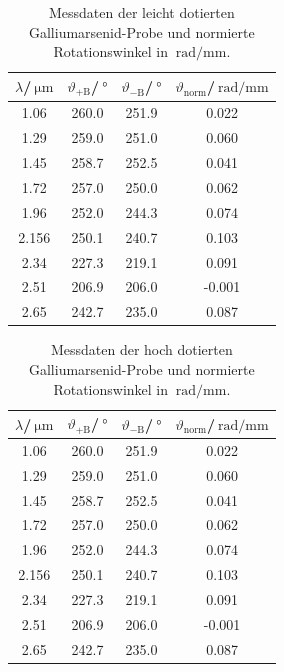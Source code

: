 \begin{table}[h!]
  \centering
  \caption{Messdaten der leicht dotierten Galliumarsenid-Probe und normierte Rotationswinkel in $\SI{}{\radian\per\milli\meter}$.}
  \label{tab:tief}
  \begin{tabular}{c | c | c | c}
    \toprule
    $\lambda$/$\SI{}{\micro\meter}$ & $\vartheta_\mathrm{+B}$/$\SI{}{\degree}$ & $\vartheta_\mathrm{-B}$/$\SI{}{\degree}$& $\vartheta_{\mathrm{norm}}$/$\SI{}{\radian\per\milli\meter}$ \\
    \midrule
    1.06 & 260.0 & 251.9 & 0.022 \\
    1.29 & 259.0 & 251.0 & 0.060 \\
    1.45 & 258.7 & 252.5 & 0.041 \\
    1.72 & 257.0 & 250.0 & 0.062 \\
    1.96 & 252.0 & 244.3 & 0.074 \\
    2.156 & 250.1 & 240.7 & 0.103 \\
    2.34 & 227.3 & 219.1 & 0.091 \\
    2.51 & 206.9 & 206.0 & -0.001 \\
    2.65 & 242.7 & 235.0 & 0.087 \\
    \bottomrule
  \end{tabular}
\end{table}

\begin{table}[h!]
  \centering
  \caption{Messdaten der hoch dotierten Galliumarsenid-Probe und normierte Rotationswinkel in $\SI{}{\radian\per\milli\meter}$.}
  \label{tab:hoch}
  \begin{tabular}{c | c | c | c}
    \toprule
    $\lambda$/$\SI{}{\micro\meter}$ & $\vartheta_\mathrm{+B}$/$\SI{}{\degree}$ & $\vartheta_\mathrm{-B}$/$\SI{}{\degree}$& $\vartheta_{\mathrm{norm}}$/$\SI{}{\radian\per\milli\meter}$ \\
    \midrule
    1.06 & 260.0 & 251.9 & 0.022 \\
    1.29 & 259.0 & 251.0 & 0.060 \\
    1.45 & 258.7 & 252.5 & 0.041 \\
    1.72 & 257.0 & 250.0 & 0.062 \\
    1.96 & 252.0 & 244.3 & 0.074 \\
    2.156 & 250.1 & 240.7 & 0.103 \\
    2.34 & 227.3 & 219.1 & 0.091 \\
    2.51 & 206.9 & 206.0 & -0.001 \\
    2.65 & 242.7 & 235.0 & 0.087 \\
    \bottomrule
  \end{tabular}
\end{table}

